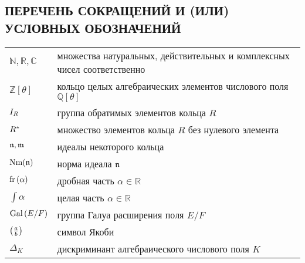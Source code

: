\documentclass[_00_dissertation.tex]{subfiles}
\begin{document}
\onlyinsubfile{
    \renewcommand{\contentsname}{ОГЛАВЛЕНИЕ}
    \setcounter{tocdepth}{3}
    \tableofcontents
}

\newpage
\begin{center}
    \section*{ПЕРЕЧЕНЬ СОКРАЩЕНИЙ И (ИЛИ) УСЛОВНЫХ ОБОЗНАЧЕНИЙ}
\end{center}

\begin{longtable}{p{}p{}}
    $\mathbb{N}, \mathbb{R}, \mathbb{C}$ & множества натуральных, действительных и
комплексных чисел соответственно\\

    $\mathbb{Z}[\theta]$ & кольцо целых алгебраических элементов числового поля $\mathbb{Q}[\theta]$\\

    $I_{R}$ & группа обратимых элементов кольца $R$\\

    $R^{*}$ & множество элементов кольца $R$ без нулевого элемента\\

    $\mathfrak{n}, \mathfrak{m}$ & идеалы некоторого кольца\\

    $\textrm{Nm}(\mathfrak{n})$ & норма идеала $\mathfrak{n}$\\

    $\textrm{fr}\left(\alpha\right)$ & дробная часть $\alpha \in \mathbb{R}$\\

    $\int{\alpha}$ & целая часть $\alpha \in \mathbb{R}$\\

    $\textrm{Gal}\left(E/F\right)$ & группа Галуа расширения поля $E/F$\\

    $\left(\frac{a}{b}\right)$ & символ Якоби\\

    $\Delta_{K}$ & дискриминант алгебраического числового поля $K$\\

\end{longtable}
\end{document}
